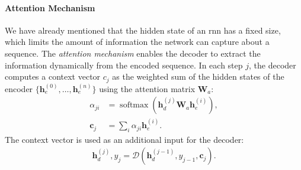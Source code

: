 {\paragraph{Attention Mechanism} We have already mentioned that the hidden state of an \ac{rnn} has a fixed size, which limits the amount of information the network can capture about a sequence. The \emph{attention mechanism} \cite{bahdanau2015neural} enables the decoder to extract the information dynamically from the encoded sequence. In each step $j$, the decoder computes a context vector $c_j$ as the weighted sum of the hidden states of the encoder $\{\mathbf{h}_e^{(0)}, \ldots, \mathbf{h}_e^{(n)}\}$ using the attention matrix $\mathbf{W}_a$:
\begin{align}
  \alpha_{ji}  & = \operatorname{softmax}(\mathbf{h}_d^{(j)}\mathbf{W}_a \mathbf{h}_e^{(i)}), \\
  \mathbf{c}_j & = \sum_i \alpha_{ji} \mathbf{h}_e^{(i)}.
\end{align}
The context vector is used as an additional input for the decoder:
\begin{align}
  \mathbf{h}_d^{(j)}, y_j = \mathcal{D}(\mathbf{h}_d^{(j-1)}, y_{j-1}, \mathbf{c}_j).
\end{align}


}
